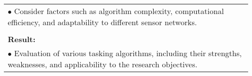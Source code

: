 \begin{table}[!h]
\begin{center}
\begin{tabular}{|p{35mm}||p{55mm}|p{50mm}||p{40mm}|}
      \multicolumn{4}{|p{150mm}|}{$\bullet$ Consider factors such as algorithm complexity, computational efficiency, and adaptability to different sensor networks.} \\
      \multicolumn{4}{|p{150mm}|}{}                                                                                                                                                                           \\
      \multicolumn{4}{|p{150mm}|}{\textbf{Result:}}                                                                                                                                                       \\
      \multicolumn{4}{|p{150mm}|}{$\bullet$ Evaluation of various tasking algorithms, including their strengths, weaknesses, and applicability to the research objectives.}                                                                                                                          \\
      \hline
    \end{tabular}
  \end{center}
\end{table}

\clearpage


